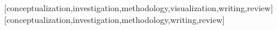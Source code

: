 \documentclass[spanish]{textolivre}
\begin{document}


\printbibliography\label{sec-bib}


\begin{contributors}
[conceptualization,investigation,methodology,visualization,writing,review]
[conceptualization,investigation,methodology,writing,review]
\end{contributors}
\end{document}

